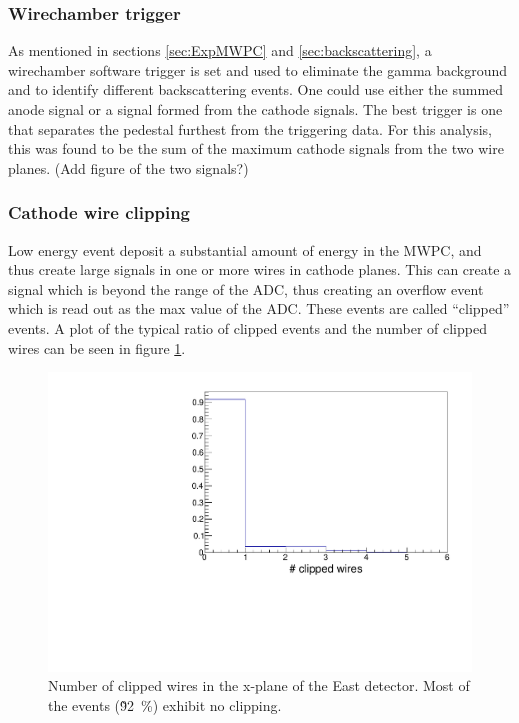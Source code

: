 \subsubsection{Wirechamber trigger} \label{sssec:mwpctrigg}

As mentioned in sections \ref{sec:ExpMWPC} and \ref{sec:backscattering}, a wirechamber
software trigger is set and used to eliminate the gamma background and to identify different
backscattering events. One could use either the summed anode signal or a signal formed from
the cathode signals. The best trigger is one that separates the pedestal furthest from the
triggering data. For this analysis, this was found to be the sum of the maximum cathode
signals from the two wire planes. (Add figure of the two signals?)

\subsubsection{Cathode wire clipping}

Low energy event deposit a substantial amount of energy in the MWPC, and thus create large
signals in one or more wires in cathode planes. This can create a signal which is beyond the
range of the ADC, thus creating an overflow event which is read out as the max value of the ADC.
These events are called ``clipped'' events. A plot of the typical ratio of clipped events and the
number of clipped wires can be seen in figure \ref{fig:nClipped}.

\begin{figure}[h]
  \centering
  \includegraphics[scale=0.6,page=1]{4-UCNACalibrations/mwpc_position.pdf} 
  \caption{Number of clipped wires in the x-plane of the East detector. Most of the events
    (\~92~\%) exhibit no clipping.}
  \label{fig:nClipped}
\end{figure}


